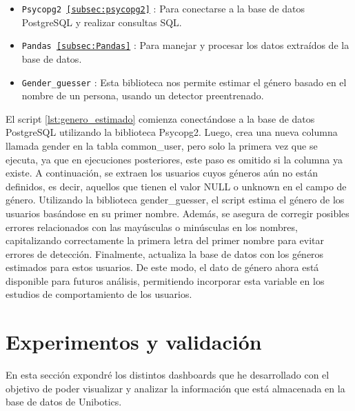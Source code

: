 \documentclass[a4paper, 12pt]{book}
\begin{document}
\begin{itemize}
    \item \texttt{Psycopg2 \ref{subsec:psycopg2}} : Para conectarse a la base de datos PostgreSQL y realizar consultas SQL.
    \item \texttt{Pandas \ref{subsec:Pandas}} : Para manejar y procesar los datos extraídos de la base de datos.
    \item \texttt{Gender\_guesser\cite{genderGuesserDocumentation}} : Esta biblioteca nos permite estimar el género basado en el nombre de un persona, usando un detector preentrenado.
\end{itemize}


El script \ref{lst:genero_estimado} comienza conectándose a la base de datos PostgreSQL utilizando la biblioteca Psycopg2. Luego, crea una nueva columna llamada gender en la tabla common\_user, pero solo la primera vez que se ejecuta, ya que en ejecuciones posteriores, este paso es omitido si la columna ya existe. A continuación, se extraen los usuarios cuyos géneros aún no están definidos, es decir, aquellos que tienen el valor NULL o unknown en el campo de género. Utilizando la biblioteca gender\_guesser, el script estima el género de los usuarios basándose en su primer nombre. Además, se asegura de corregir posibles errores relacionados con las mayúsculas o minúsculas en los nombres, capitalizando correctamente la primera letra del primer nombre para evitar errores de detección. Finalmente, actualiza la base de datos con los géneros estimados para estos usuarios. De este modo, el dato de género ahora está disponible para futuros análisis, permitiendo incorporar esta variable en los estudios de comportamiento de los usuarios.



\cleardoublepage



\chapter{Experimentos y validación}
\label{chap:experimentos}

En esta sección expondré los distintos dashboards que he desarrollado con el objetivo de poder visualizar y analizar la información que está almacenada en la base de datos de Unibotics.
\end{document}
